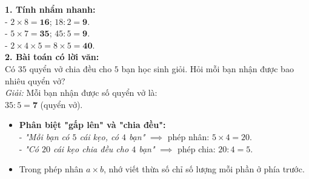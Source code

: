 \documentclass[10pt,a4paper]{article}
\begin{document}
\vspace{-1.5mm}
\noindent
\begin{minipage}[t]{0.49\textwidth}\vspace{0pt}
\begin{tcolorbox}[
  enhanced,
  colback=green!4!white,
  colframe=green!60!black,
  arc=2mm, boxrule=0.8pt,
  left=2mm, right=2mm, top=1.8mm, bottom=1.8mm,
  title={\footnotesize\bfseries\color{white}\faCheckCircle\ 4. Bài tập thực hành mẫu}
]
{\footnotesize
\textbf{1. Tính nhẩm nhanh:}\\
- $2 \times 8 = \mathbf{16}$; \quad $18 : 2 = \mathbf{9}$.\\
- $5 \times 7 = \mathbf{35}$; \quad $45 : 5 = \mathbf{9}$.\\
- $2 \times 4 \times 5 = 8 \times 5 = \mathbf{40}$.\\
\textbf{2. Bài toán có lời văn:}\\
Có $35$ quyển vở chia đều cho $5$ bạn học sinh giỏi. Hỏi mỗi bạn nhận được bao nhiêu quyển vở?\\
\textit{Giải:} Mỗi bạn nhận được số quyển vở là:\\
$35 : 5 = \mathbf{7}$ (quyển vở).
}
\end{tcolorbox}
\end{minipage}
\hfill
\begin{minipage}[t]{0.49\textwidth}\vspace{0pt}
\begin{tcolorbox}[
  enhanced,
  colback=rose!4!white,
  colframe=rose!70!black,
  arc=2mm, boxrule=0.8pt,
  left=2mm, right=2mm, top=1.8mm, bottom=1.8mm,
  title={\footnotesize\bfseries\color{white}\faExclamationTriangle\ 5. Lỗi phân biệt dạng toán}
]
{\footnotesize
\begin{itemize}\setlength{\itemsep}{1.5pt}\setlength{\leftskip}{-2.5mm}
  \item \textbf{Phân biệt "gấp lên" và "chia đều":}\\
  - \textit{"Mỗi bạn có $5$ cái kẹo, có $4$ bạn"} $\implies$ phép nhân: $5 \times 4 = 20$.\\
  - \textit{"Có $20$ cái kẹo chia đều cho $4$ bạn"} $\implies$ phép chia: $20 : 4 = 5$.
  \item Trong phép nhân $a \times b$, nhớ viết thừa số chỉ số lượng mỗi phần ở phía trước.
\end{itemize}
}
\end{tcolorbox}
\end{minipage}
\end{document}
